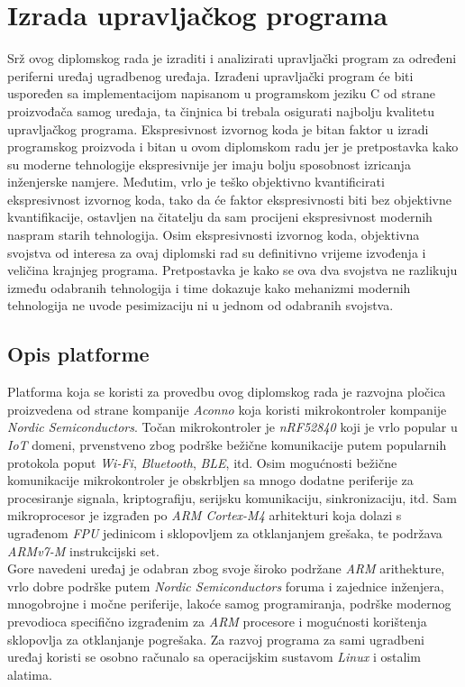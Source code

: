 \chapter{Izrada upravljačkog programa}
Srž ovog diplomskog rada je izraditi i analizirati upravljački program za određeni periferni uređaj ugradbenog uređaja. Izrađeni upravljački program će biti uspoređen sa implementacijom napisanom u programskom jeziku C od strane proizvođača samog uređaja, ta činjnica bi trebala osigurati najbolju kvalitetu upravljačkog programa. Ekspresivnost izvornog koda je bitan faktor u izradi programskog proizvoda i bitan u ovom diplomskom radu jer je pretpostavka kako su moderne tehnologije ekspresivnije jer imaju bolju sposobnost izricanja inženjerske namjere. Međutim, vrlo je teško objektivno kvantificirati ekspresivnost izvornog koda, tako da će faktor ekspresivnosti biti bez objektivne kvantifikacije, ostavljen na čitatelju da sam procijeni ekspresivnost modernih naspram starih tehnologija. Osim ekspresivnosti izvornog koda, objektivna svojstva od interesa za ovaj diplomski rad su definitivno vrijeme izvođenja i veličina krajnjeg programa. Pretpostavka je kako se ova dva svojstva ne razlikuju između odabranih tehnologija i time dokazuje kako mehanizmi modernih tehnologija ne uvode pesimizaciju ni u jednom od odabranih svojstva. 

\section{Opis platforme}
Platforma koja se koristi za provedbu ovog diplomskog rada je razvojna pločica proizvedena od strane kompanije \textit{Aconno} koja koristi mikrokontroler kompanije \textit{Nordic Semiconductors}. Točan mikrokontroler je \textit{nRF52840} koji je vrlo popular u \textit{IoT} domeni, prvenstveno zbog podrške bežične komunikacije putem popularnih protokola poput \textit{Wi-Fi}, \textit{Bluetooth}, \textit{BLE}, itd. Osim mogućnosti bežične komunikacije mikrokontroler je obskrbljen sa mnogo dodatne periferije za procesiranje signala, kriptografiju, serijsku komunikaciju, sinkronizaciju, itd. Sam mikroprocesor je izgrađen po \textit{ARM Cortex-M4} arhitekturi koja dolazi s ugrađenom \textit{FPU} jedinicom i sklopovljem za otklanjanjem grešaka, te podržava \textit{ARMv7-M} instrukcijski set. \\
Gore navedeni uređaj je odabran zbog svoje široko podržane \textit{ARM} arithekture, vrlo dobre podrške putem \textit{Nordic Semiconductors} foruma i zajednice inženjera, mnogobrojne i močne periferije, lakoće samog programiranja, podrške modernog prevodioca specifično izgrađenim za \textit{ARM} procesore i mogućnosti korištenja sklopovlja za otklanjanje pogrešaka. Za razvoj programa za sami ugradbeni uređaj koristi se osobno računalo sa operacijskim sustavom \textit{Linux} i ostalim alatima. 

